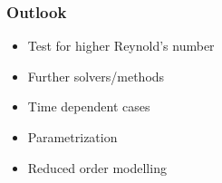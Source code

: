 \documentclass{beamer}
\begin{document}

\begin{frame}
\frametitle{Outlook}
\begin{itemize}

\item Test for higher Reynold's number
\item Further solvers/methods
\item Time dependent cases
\item Parametrization
\item Reduced order modelling

\end{itemize}


\end{frame}




\end{document}
